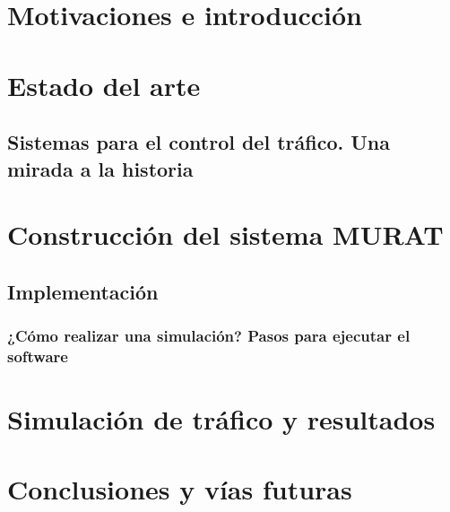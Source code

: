 \part{Motivaciones e introducción}
    \label{part:one}


\part{Estado del arte}
    \label{part:two}
\chapter{Sistemas para el control del tráfico. Una mirada a la historia}
    \label{chap:two}

\part{Construcción del sistema MURAT}
    \label{part:three}




\chapter{Implementación}
    \label{chap:five}
    
\section{¿Cómo realizar una simulación? Pasos para ejecutar el software}

\part{Simulación de tráfico y resultados}
    \label{part:four}


\part{Conclusiones y vías futuras}
    \label{part:five}

